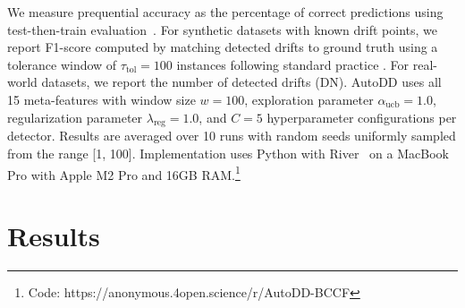 \documentclass{article}
\begin{document}
\begin{table}[!htb]
\centering
\caption{Dataset characteristics (Multiple* = Sudden, Gradual, Incremental, and Normal drift types)}
\label{tab:datasets}
\end{table}

We measure prequential accuracy as the percentage of correct predictions using test-then-train evaluation~\cite{Bifet2010MOA}. For synthetic datasets with known drift points, we report F1-score computed by matching detected drifts to ground truth using a tolerance window of $\tau_{\text{tol}}=100$ instances following standard practice \cite{Bifet2007ADWIN}. For real-world datasets, we report the number of detected drifts (DN). AutoDD uses all 15 meta-features with window size $w=100$, exploration parameter $\alpha_{\text{ucb}}=1.0$, regularization parameter $\lambda_{\text{reg}}=1.0$, and $C=5$ hyperparameter configurations per detector. Results are averaged over 10 runs with random seeds uniformly sampled from the range [1, 100]. Implementation uses Python with River~\cite{montiel2021river} on a MacBook Pro with Apple M2 Pro and 16GB RAM.\footnote{Code: https://anonymous.4open.science/r/AutoDD-BCCF}

\section{Results}
\label{sec:results}
\end{document}
